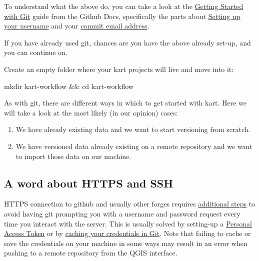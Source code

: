 \documentclass[
  letterpaper,
  DIV=11,
  numbers=noendperiod]{scrartcl}
\newenvironment{Shaded}{\begin{snugshade}}{\end{snugshade}}
\newcommand{\BuiltInTok}[1]{\textcolor[rgb]{0.55,0.91,0.99}{#1}}
\newcommand{\FunctionTok}[1]{\textcolor[rgb]{0.31,0.98,0.48}{#1}}
\newcommand{\KeywordTok}[1]{\textcolor[rgb]{1.00,0.47,0.78}{#1}}
\newcommand{\NormalTok}[1]{\textcolor[rgb]{0.97,0.97,0.95}{#1}}
\begin{document}
To understand what the above do, you can take a look at the
\href{https://docs.github.com/en/get-started/getting-started-with-git/set-up-git\#setting-up-git}{Getting
Started with Git} guide from the Github Docs, specifically the parts
about
\href{https://docs.github.com/en/get-started/getting-started-with-git/setting-your-username-in-git}{Setting
up your username} and your
\href{https://docs.github.com/en/account-and-profile/setting-up-and-managing-your-personal-account-on-github/managing-email-preferences/setting-your-commit-email-address}{commit
email address}.

If you have already used git, chances are you have the above already
set-up, and you can continue on.

Create an empty folder where your kart projects will live and move into
it:

\begin{Shaded}
\begin{Highlighting}[]
\FunctionTok{mkdir}\NormalTok{ kart{-}workflow }\KeywordTok{\&\&} \BuiltInTok{cd}\NormalTok{ kart{-}workflow}
\end{Highlighting}
\end{Shaded}

As with git, there are different ways in which to get started with kart.
Here we will take a look at the most likely (in our opinion) cases:

\begin{enumerate}
\def\labelenumi{\arabic{enumi}.}
\item
  We have already existing data and we want to start versioning from
  scratch.
\item
  We have versioned data already existing on a remote repository and we
  want to import those data on our machine.
\end{enumerate}

\subsection{A word about HTTPS and SSH}\label{sec-https-ssh}

HTTPS connection to github and usually other forges requires
\href{https://docs.github.com/en/get-started/getting-started-with-git/why-is-git-always-asking-for-my-password}{additional
steps} to avoid having git prompting you with a username and password
request every time you interact with the server. This is usually solved
by setting-up a
\href{https://docs.github.com/en/authentication/keeping-your-account-and-data-secure/managing-your-personal-access-tokens}{Personal
Access Token} or by
\href{https://docs.github.com/en/get-started/getting-started-with-git/caching-your-github-credentials-in-git}{caching
your credentials in Git}. Note that failing to cache or save the
credentials on your machine in some ways may result in an error when
pushing to a remote repository from the QGIS interface.
\end{document}
